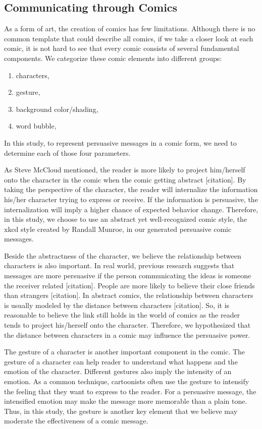 \subsection{Communicating through Comics}
As a form of art, the creation of comics has few limitations. Although there is no common template that could describe all comics, if we take a closer look at each comic, it is not hard to see that every comic consists of several fundamental components. We categorize these comic elements into different groups:
\begin{enumerate}
\item	characters,
\item gesture,
\item	background color/shading,
\item	word bubble,
 \end{enumerate}\par
In this study, to represent persuasive messages in a comic form, we need to determine each of those four parameters.\par
As Steve McCloud mentioned, the reader is more likely to project him/herself onto the character in the comic when the comic getting abstract [citation]. By taking the perspective of the character, the reader will internalize the information his/her character trying to express or receive. If the information is persuasive, the internalization will imply a higher chance of expected behavior change. Therefore, in this study, we choose to use an abstract yet well-recognized comic style, the xkcd style created by Randall Munroe, in our generated persuasive comic messages.\par
Beside the abstractness of the character, we believe the relationship between characters is also important. In real world, previous research suggests that messages are more persuasive if the person communicating the ideas is someone the receiver related [citation]. People are more likely to believe their close friends than strangers [citation]. In abstract comics, the relationship between characters is usually modeled by the distance between characters [citation]. So, it is reasonable to believe the link still holds in the world of comics as the reader tends to project his/herself onto the character. Therefore, we hypothesized that the distance between characters in a comic may influence the persuasive power.\par
The gesture of a character is another important component in the comic. The gesture of a character can help reader to understand what happens and the emotion of the character. Different gestures also imply the intensity of an emotion. As a common technique, cartoonists often use the gesture to intensify the feeling that they want to express to the reader. For a persuasive message, the intensified emotion may make the message more memorable than a plain tone. Thus, in this study, the gesture is another key element that we believe may moderate the effectiveness of a comic message.\par

